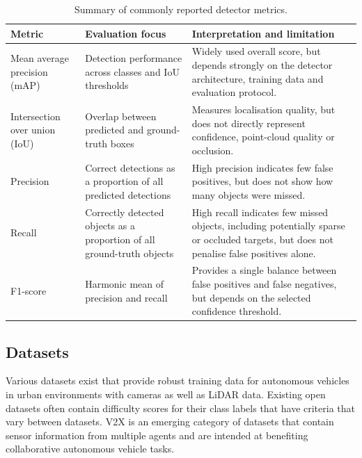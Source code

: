 \documentclass[12pt,a4paper]{article}
\begin{document}
\begin{table}[htbp]
    \centering
    \caption{Summary of commonly reported detector metrics.}
    \label{tab:detector-metrics}
    \small
    \setlength{\tabcolsep}{3pt}
    \sloppy
    \renewcommand{\arraystretch}{1.15}
    \begin{tabularx}{\textwidth}{|p{2.7cm}|p{4.1cm}|Y|}
        \hline
        \textbf{Metric} & \textbf{Evaluation focus} & \textbf{Interpretation and limitation} \\
        \hline
        Mean average precision (mAP) & Detection performance across classes and IoU thresholds & Widely used overall score, but depends strongly on the detector architecture, training data and evaluation protocol. \\
        \hline
        Intersection over union (IoU) & Overlap between predicted and ground-truth boxes & Measures localisation quality, but does not directly represent confidence, point-cloud quality or occlusion. \\
        \hline
        Precision & Correct detections as a proportion of all predicted detections & High precision indicates few false positives, but does not show how many objects were missed. \\
        \hline
        Recall & Correctly detected objects as a proportion of all ground-truth objects & High recall indicates few missed objects, including potentially sparse or occluded targets, but does not penalise false positives alone. \\
        \hline
        F1-score & Harmonic mean of precision and recall & Provides a single balance between false positives and false negatives, but depends on the selected confidence threshold. \\
        \hline
    \end{tabularx}
\end{table}

\subsection{Datasets}

Various datasets exist that provide robust training data for autonomous
vehicles in urban environments with cameras as well as LiDAR data.
Existing open datasets often contain difficulty scores for their class
labels that have criteria that vary between datasets. V2X is an emerging
category of datasets that contain sensor information from multiple
agents and are intended at benefiting collaborative autonomous vehicle tasks.
\end{document}
